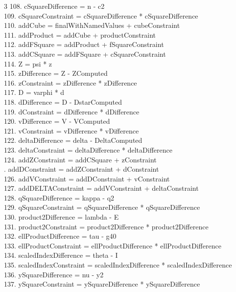 \documentclass[10pt]{article}
\begin{document}
\begin{multicols}{3}
108. cSquareDifference = n - c2\\
109. cSquareConstraint = cSquareDifference * cSquareDifference\\
110. addCube = finalWithNamedValues + cubeConstraint\\
111. addProduct = addCube + productConstraint\\
112. addFSquare = addProduct + fSquareConstraint\\
113. addCSquare = addFSquare + cSquareConstraint\\
114. Z = psi * z\\
115. zDifference = Z - ZComputed\\
116. zConstraint = zDifference * zDifference\\
117. D = varphi * d\\
118. dDifference = D - DstarComputed\\
119. dConstraint = dDifference * dDifference\\
120. vDifference = V - VComputed\\
121. vConstraint = vDifference * vDifference\\
122. deltaDifference = delta - DeltaComputed\\
123. deltaConstraint = deltaDifference * deltaDifference\\
124. addZConstraint = addCSquare + zConstraint\\
. addDConstraint = addZConstraint + dConstraint\\
126. addVConstraint = addDConstraint + vConstraint\\
127. addDELTAConstraint = addVConstraint + deltaConstraint\\
128. qSquareDifference = kappa - q2\\
129. qSquareConstraint = qSquareDifference * qSquareDifference\\
130. product2Difference = lambda - E\\
131. product2Constraint = product2Difference * product2Difference\\
132. ellProductDifference = tau - g40\\
133. ellProductConstraint = ellProductDifference * ellProductDifference\\
134. scaledIndexDifference = theta - I\\
135. scaledIndexConstraint = scaledIndexDifference * scaledIndexDifference\\
136. ySquareDifference = nu - y2\\
137. ySquareConstraint = ySquareDifference * ySquareDifference\\

\end{multicols}
\end{document}
